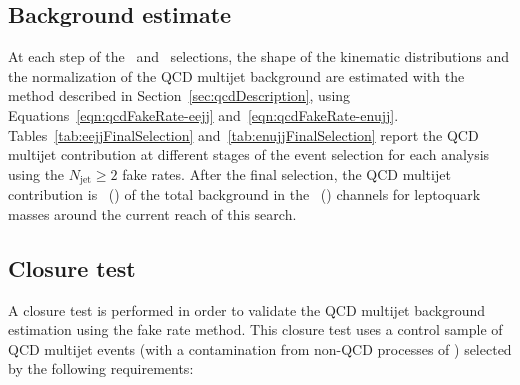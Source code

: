 \subsection{Background estimate}
\label{sec:qcdEstimate}
At each step of the \eejj~and \enujj~selections, the shape of the kinematic
distributions and the normalization of the QCD multijet background are estimated with the method
described in Section~\ref{sec:qcdDescription}, using Equations~\ref{eqn:qcdFakeRate-eejj} and~\ref{eqn:qcdFakeRate-enujj}.  
Tables~\ref{tab:eejjFinalSelection} and~\ref{tab:enujjFinalSelection} report the QCD multijet contribution at different stages
of the event selection for each analysis using the $N_{\text{jet}} \geq 2$ fake rates. 
After the final selection, the QCD multijet contribution is \QCDcontributionINeejj~(\QCDcontributionINenujj) 
of the total background in the \eejj~(\enujj) channels for leptoquark masses around the current reach of this search.  

\subsection{Closure test}
\label{sec:qcdClosureTest}
A closure test is performed in order to validate the QCD multijet background 
estimation using the fake rate method. This closure test uses a control sample of 
QCD multijet events (with a contamination from non-QCD processes of \ContaminationAtQCDForClosureTestLooseLoose)
selected by the following requirements:

